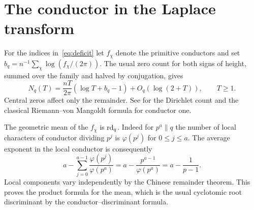 \documentclass[11pt]{article}
\begin{document}
\section{The conductor in the Laplace transform}
For the indices in~\eqref{eq:deficit} let $f_\chi$ denote the primitive conductors and set $b_q=n^{-1}\sum_\chi\log(f_\chi/(2\pi))$. The usual zero count for both signs of height, summed over the family and halved by conjugation, gives
\begin{equation}\label{eq:count}
 N_q(T)=\frac{nT}{2\pi}(\log T+b_q-1)+O_q(\log(2+T)),\qquad T\ge1.
\end{equation}
Central zeros affect only the remainder. See \cite{bennett} for the Dirichlet count and the classical Riemann--von Mangoldt formula for conductor one.

The geometric mean of the $f_\chi$ is $\operatorname{rd}_q$. Indeed for $p^a\parallel q$ the number of local characters of conductor dividing $p^j$ is $\varphi(p^j)$ for $0\le j\le a$. The average exponent in the local conductor is consequently
\[
 a-\sum_{j=0}^{a-1}\frac{\varphi(p^j)}{\varphi(p^a)}
 =a-\frac{p^{a-1}}{\varphi(p^a)}
 =a-\frac1{p-1}.
\]
Local components vary independently by the Chinese remainder theorem. This proves the product formula for the mean, which is the usual cyclotomic root discriminant by the conductor--discriminant formula.
\end{document}
